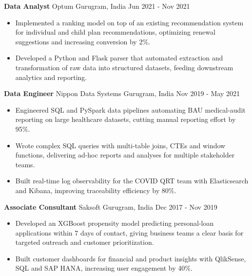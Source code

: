 \documentclass[10pt,a4paper]{article}
\newcommand{\role}[4]{\textbf{#1} \textbar{} #2 \hfill #3 \textbar{} #4\par}
\begin{document}
\vspace{3pt}
\role{Data Analyst}{Optum}{Gurugram, India}{Jun 2021 - Nov 2021}
\begin{itemize}
  \item Implemented a ranking model on top of an existing recommendation system for individual and child plan recommendations, optimizing renewal suggestions and increasing conversion by 2\%.
  \item Developed a Python and Flask parser that automated extraction and transformation of raw data into structured datasets, feeding downstream analytics and reporting.
\end{itemize}
\vspace{3pt}
\role{Data Engineer}{Nippon Data Systems}{Gurugram, India}{Nov 2019 - May 2021}
\begin{itemize}
  \item Engineered SQL and PySpark data pipelines automating BAU medical-audit reporting on large healthcare datasets, cutting manual reporting effort by 95\%.
  \item Wrote complex SQL queries with multi-table joins, CTEs and window functions, delivering ad-hoc reports and analyses for multiple stakeholder teams.
  \item Built real-time log observability for the COVID QRT team with Elasticsearch and Kibana, improving traceability efficiency by 80\%.
\end{itemize}
\vspace{3pt}
\role{Associate Consultant}{Saksoft}{Gurugram, India}{Dec 2017 - Nov 2019}
\begin{itemize}
  \item Developed an XGBoost propensity model predicting personal-loan applications within 7 days of contact, giving business teams a clear basis for targeted outreach and customer prioritization.
  \item Built customer dashboards for financial and product insights with QlikSense, SQL and SAP HANA, increasing user engagement by 40\%.
\end{itemize}
\end{document}
